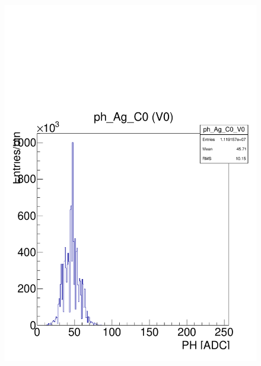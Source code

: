\documentclass[a4paper,12pt,twoside]{article}
\begin{document}
\begin{figure} [h!]
\begin{minipage}{.48\textwidth}
  \includegraphics[width=\textwidth]{./Figures/HRData_ph_histo.pdf}
  \label{HRData-PHHisto}
\end{minipage}
\end{figure}
\end{document}
